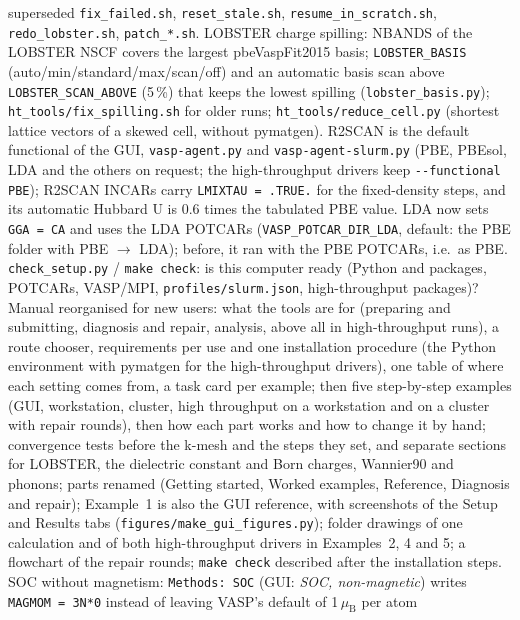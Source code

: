 \documentclass[11pt,a4paper]{scrartcl}
\begin{document}
\begin{description}
    superseded \texttt{fix\_failed.sh}, \texttt{reset\_stale.sh},
    \texttt{resume\_in\_scratch.sh}, \texttt{redo\_lobster.sh}, \texttt{patch\_*.sh}.
    LOBSTER charge spilling: NBANDS of the LOBSTER NSCF covers the largest pbeVaspFit2015 basis;
    \texttt{LOBSTER\_BASIS} (auto/min/standard/max/scan/off) and an automatic basis scan above
    \texttt{LOBSTER\_SCAN\_ABOVE} (5\,\%) that keeps the lowest spilling
    (\texttt{lobster\_basis.py}); \texttt{ht\_tools/fix\_spilling.sh} for older runs; \texttt{ht\_tools/reduce\_cell.py}
    (shortest lattice vectors of a skewed cell, without pymatgen).
    R2SCAN is the default functional of the GUI, \texttt{vasp-agent.py} and
    \texttt{vasp-agent-slurm.py} (PBE, PBEsol, LDA and the others on request; the
    high-throughput drivers keep \texttt{-{}-functional PBE}); R2SCAN INCARs carry
    \texttt{LMIXTAU = .TRUE.} for the fixed-density steps, and its automatic Hubbard U is 0.6
    times the tabulated PBE value.  LDA now sets \texttt{GGA = CA} and uses the LDA POTCARs
    (\texttt{VASP\_POTCAR\_DIR\_LDA}, default: the PBE folder with PBE $\to$ LDA); before,
    it ran with the PBE POTCARs, i.e.\ as PBE.
    \texttt{check\_setup.py} / \texttt{make check}: is this computer ready (Python and packages,
    POTCARs, VASP/MPI, \texttt{profiles/slurm.json}, high-throughput packages)?
    Manual reorganised for new users: what the tools are for (preparing and submitting,
    diagnosis and repair, analysis, above all in high-throughput runs), a route chooser,
    requirements per use and one installation procedure (the Python environment with pymatgen
    for the high-throughput drivers), one table of where each setting comes from, a task card
    per example; then five step-by-step examples (GUI,
    workstation, cluster, high throughput on a workstation and on a cluster with repair
    rounds), then how each part works and how to change it by hand; convergence tests before
    the k-mesh and the steps they set, and separate sections for LOBSTER, the dielectric
    constant and Born charges, Wannier90 and phonons; parts renamed (Getting started, Worked examples, Reference, Diagnosis and repair);
    Example~1 is also the GUI reference, with screenshots of the Setup and Results tabs
    (\texttt{figures/make\_gui\_figures.py}); folder drawings of one calculation and of both
    high-throughput drivers in Examples~2, 4 and 5; a flowchart of the repair rounds;
    \texttt{make check} described after the installation steps.
    SOC without magnetism: \texttt{Methods: SOC} (GUI: \emph{SOC, non-magnetic}) writes
    \texttt{MAGMOM = 3N*0} instead of leaving VASP's default of 1\,$\mu_{\mathrm{B}}$ per atom

\end{description}
\end{document}
